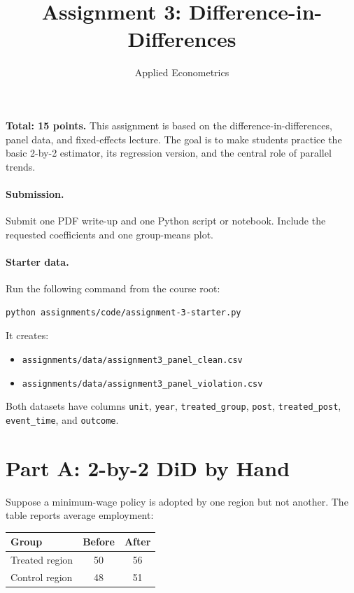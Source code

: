 \documentclass[11pt]{article}
\title{Assignment 3: Difference-in-Differences}
\author{Applied Econometrics}
\date{}
\begin{document}
\maketitle

\noindent\textbf{Total: 15 points.} This assignment is based on the difference-in-differences, panel data, and fixed-effects lecture. The goal is to make students practice the basic 2-by-2 estimator, its regression version, and the central role of parallel trends.

\paragraph{Submission.} Submit one PDF write-up and one Python script or notebook. Include the requested coefficients and one group-means plot.

\paragraph{Starter data.} Run the following command from the course root:
\begin{lstlisting}
python assignments/code/assignment-3-starter.py
\end{lstlisting}
It creates:
\begin{itemize}
  \item \texttt{assignments/data/assignment3\_panel\_clean.csv}
  \item \texttt{assignments/data/assignment3\_panel\_violation.csv}
\end{itemize}
Both datasets have columns \texttt{unit}, \texttt{year}, \texttt{treated\_group}, \texttt{post}, \texttt{treated\_post}, \texttt{event\_time}, and \texttt{outcome}.

\section*{Part A: 2-by-2 DiD by Hand}

Suppose a minimum-wage policy is adopted by one region but not another. The table reports average employment:

\begin{center}
\begin{tabular}{lcc}
\toprule
Group & Before & After \\
\midrule
Treated region & 50 & 56 \\
Control region & 48 & 51 \\
\bottomrule
\end{tabular}
\end{center}
\end{document}
